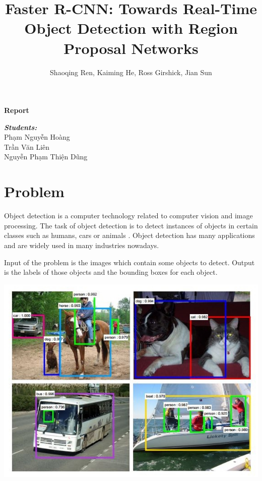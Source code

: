 \documentclass{article}
\begin{document}
\title{Faster R-CNN: Towards Real-Time Object Detection with Region Proposal Networks}
\date{}
\author{Shaoqing Ren, Kaiming He, Ross Girshick, Jian Sun}

\begin{center}
	\Large{\textbf{Report}} \\
\end{center}

{\let\newpage\relax\maketitle }


\begin{flushright}
	\textbf{\textit{Students:} }\\
	Phạm Nguyễn Hoàng \\
	Trần Văn Liên \\
	Nguyễn Phạm Thiện Dũng \\
\end{flushright}

\section{Problem}

Object detection is a computer technology related to computer vision and image processing. The task of object detection is to detect instances of objects in certain classes such as humans, cars or animals \cite{wiki/object-detection}. Object detection has many applications and are widely used in many industries nowadays.

Input of the problem is the images which contain some objects to detect. Output is the labels of those objects and the bounding boxes for each object.

\begin{center}
	\includegraphics[scale=0.5]{object_detection}
\end{center}
\end{document}
